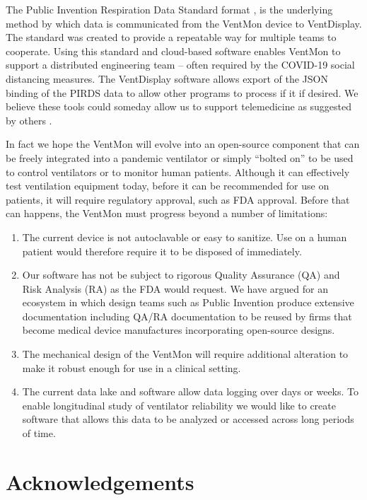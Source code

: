 \documentclass[11pt, letterpaper]{article}
\begin{document}
The Public Invention Respiration Data Standard format \cite{PIRDS}, is the underlying method by which data is communicated from the VentMon device to VentDisplay. The standard was created to provide a repeatable way for multiple teams to cooperate. Using this standard and cloud-based software enables VentMon to support a distributed engineering team -- often required by the COVID-19 social distancing measures. The VentDisplay software allows export of the JSON binding of the PIRDS data to allow other programs to process if it if desired. We believe these tools could someday allow us to support telemedicine as suggested by others \cite{rehm2018development}. 

In fact we hope the VentMon will evolve into an open-source component that can be freely integrated into a pandemic ventilator or simply ``bolted on'' to be used to control ventilators or to monitor human patients. Although it can effectively test ventilation equipment today, before it can be recommended for use on patients, it will require regulatory approval, such as FDA approval. Before that can happens, the VentMon must progress beyond a number of limitations:
\begin{enumerate}
\item The current device is not autoclavable or easy to sanitize. Use on a human patient would therefore require it to be disposed of immediately.
\item Our software has not be subject to rigorous Quality Assurance (QA) and Risk Analysis (RA) as the FDA would request. We have argued\cite{ecosystem} for an ecosystem in which design teams such as Public Invention produce extensive documentation including  QA/RA documentation to be reused by firms that become medical device manufactures incorporating open-source designs.
\item The mechanical design of the VentMon will require additional alteration to make it robust enough for use in a clinical setting.
\item The current data lake and software allow data  logging over days or weeks. To enable longitudinal study of ventilator reliability we would like to create software that allows this data to be analyzed or accessed across long periods of time.
\end{enumerate}



\section{Acknowledgements}
\end{document}
